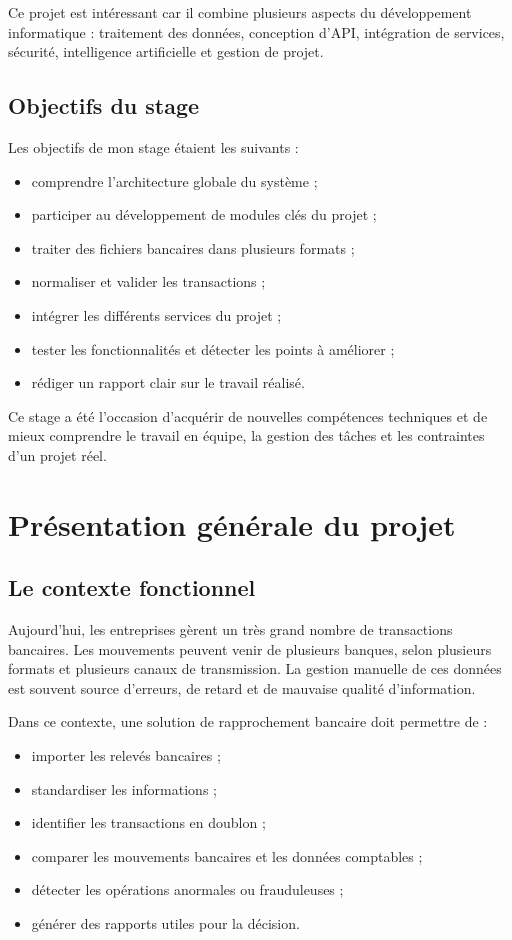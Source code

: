 ﻿\documentclass[12pt,a4paper]{report}
\begin{document}
Ce projet est intéressant car il combine plusieurs aspects du développement informatique : traitement des données, conception d'API, intégration de services, sécurité, intelligence artificielle et gestion de projet.

\section{Objectifs du stage}
Les objectifs de mon stage étaient les suivants :
\begin{itemize}[leftmargin=1.5em]
    \item comprendre l'architecture globale du système ;
    \item participer au développement de modules clés du projet ;
    \item traiter des fichiers bancaires dans plusieurs formats ;
    \item normaliser et valider les transactions ;
    \item intégrer les différents services du projet ;
    \item tester les fonctionnalités et détecter les points à améliorer ;
    \item rédiger un rapport clair sur le travail réalisé.
\end{itemize}

Ce stage a été l'occasion d'acquérir de nouvelles compétences techniques et de mieux comprendre le travail en équipe, la gestion des tâches et les contraintes d'un projet réel.

\chapter{Présentation générale du projet}
\section{Le contexte fonctionnel}
Aujourd'hui, les entreprises gèrent un très grand nombre de transactions bancaires. Les mouvements peuvent venir de plusieurs banques, selon plusieurs formats et plusieurs canaux de transmission. La gestion manuelle de ces données est souvent source d'erreurs, de retard et de mauvaise qualité d'information.

Dans ce contexte, une solution de rapprochement bancaire doit permettre de :
\begin{itemize}[leftmargin=1.5em]
    \item importer les relevés bancaires ;
    \item standardiser les informations ;
    \item identifier les transactions en doublon ;
    \item comparer les mouvements bancaires et les données comptables ;
    \item détecter les opérations anormales ou frauduleuses ;
    \item générer des rapports utiles pour la décision.
\end{itemize}
\end{document}
